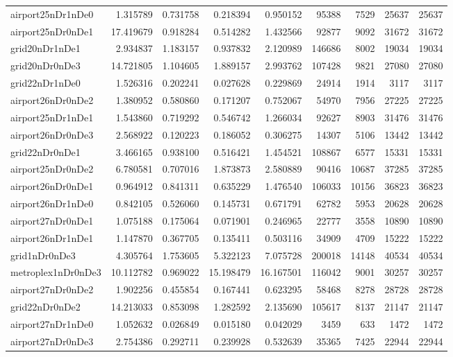 \begin{longtable}{|l|r|r|r|r|r|r|r|r|}
airport25nDr1nDe0 & 1.315789 & 0.731758 & 0.218394 & 0.950152 & 95388 & 7529 & 25637 & 25637 \\
airport25nDr0nDe1 & 17.419679 & 0.918284 & 0.514282 & 1.432566 & 92877 & 9092 & 31672 & 31672 \\
grid20nDr1nDe1 & 2.934837 & 1.183157 & 0.937832 & 2.120989 & 146686 & 8002 & 19034 & 19034 \\
grid20nDr0nDe3 & 14.721805 & 1.104605 & 1.889157 & 2.993762 & 107428 & 9821 & 27080 & 27080 \\
grid22nDr1nDe0 & 1.526316 & 0.202241 & 0.027628 & 0.229869 & 24914 & 1914 & 3117 & 3117 \\
airport26nDr0nDe2 & 1.380952 & 0.580860 & 0.171207 & 0.752067 & 54970 & 7956 & 27225 & 27225 \\
airport25nDr1nDe1 & 1.543860 & 0.719292 & 0.546742 & 1.266034 & 92627 & 8903 & 31476 & 31476 \\
airport26nDr0nDe3 & 2.568922 & 0.120223 & 0.186052 & 0.306275 & 14307 & 5106 & 13442 & 13442 \\
grid22nDr0nDe1 & 3.466165 & 0.938100 & 0.516421 & 1.454521 & 108867 & 6577 & 15331 & 15331 \\
airport25nDr0nDe2 & 6.780581 & 0.707016 & 1.873873 & 2.580889 & 90416 & 10687 & 37285 & 37285 \\
airport26nDr0nDe1 & 0.964912 & 0.841311 & 0.635229 & 1.476540 & 106033 & 10156 & 36823 & 36823 \\
airport26nDr1nDe0 & 0.842105 & 0.526060 & 0.145731 & 0.671791 & 62782 & 5953 & 20628 & 20628 \\
airport27nDr0nDe1 & 1.075188 & 0.175064 & 0.071901 & 0.246965 & 22777 & 3558 & 10890 & 10890 \\
airport26nDr1nDe1 & 1.147870 & 0.367705 & 0.135411 & 0.503116 & 34909 & 4709 & 15222 & 15222 \\
grid1nDr0nDe3 & 4.305764 & 1.753605 & 5.322123 & 7.075728 & 200018 & 14148 & 40534 & 40534 \\
metroplex1nDr0nDe3 & 10.112782 & 0.969022 & 15.198479 & 16.167501 & 116042 & 9001 & 30257 & 30257 \\
airport27nDr0nDe2 & 1.902256 & 0.455854 & 0.167441 & 0.623295 & 58468 & 8278 & 28728 & 28728 \\
grid22nDr0nDe2 & 14.213033 & 0.853098 & 1.282592 & 2.135690 & 105617 & 8137 & 21147 & 21147 \\
airport27nDr1nDe0 & 1.052632 & 0.026849 & 0.015180 & 0.042029 & 3459 & 633 & 1472 & 1472 \\
airport27nDr0nDe3 & 2.754386 & 0.292711 & 0.239928 & 0.532639 & 35365 & 7425 & 22944 & 22944 \\

\end{longtable}
